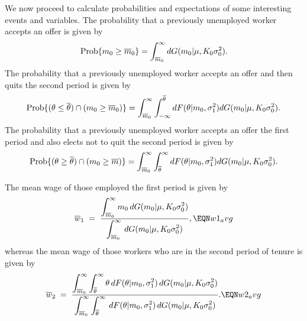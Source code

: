 We now proceed to calculate probabilities and expectations of some interesting
events and variables.  The probability that a previously unemployed worker
accepts an offer is given by
$${\rm Prob} \{m_0\ge\overline m_0\} = \int_{\overline m_0}^\infty dG (m_0|\mu,
K_0 \sigma^2_{0}).$$
The probability that a previously unemployed worker accepts an offer and then
quits the second period is given by
$$
{\rm Prob} \{({\theta}\le\overline{{\theta}})\cap (m_0\ge \overline m_0)\} =\int_{\overline m_0}^\infty
\int_{-\infty}^{\overline{{\theta}}} dF({\theta}|m_0, \sigma^2_{1})
dG (m_0|\mu, K_0 \sigma^2_{0}).$$
The probability that a previously unemployed worker accepts an offer the first
period and also elects not to quit the second period is given by
$${\rm Prob} \{({\theta}\ge\overline {{\theta}})\cap (m_0\ge\overline m)\} =\int_{\overline m_0}^\infty
\int_{\overline{{\theta}}}^\infty dF ({\theta}|m_0, \sigma^2_{1})
dG (m_0|\mu, K_0 \sigma^2_{0}).$$

The mean wage of those employed the first period is given by
$$
\overline w_1 \;=\; { \displaystyle \int_{\overline m_0}^\infty m_0
                                    \, dG(m_0 \vert \mu, K_0 \sigma^2_{0})
         \over \displaystyle \int_{\overline m_0}^\infty
                                    \, dG(m_0 \vert \mu, K_0 \sigma^2_{0}) },
\EQN w1_avg
$$
whereas the mean wage of those workers who are in the second period of tenure
is given by
$$
\overline w_2 \;=\; { \displaystyle \int_{\overline m_0}^\infty
                 \int_{\overline \theta}^\infty \theta
                             \, dF(\theta \vert m_0, \sigma_{1}^2)
                             \, dG(m_0 \vert \mu, K_0 \sigma^2_{0})
         \over \displaystyle \int_{\overline m_0}^\infty
                 \int_{\overline \theta}^\infty
                             \, dF(\theta \vert m_0, \sigma_{1}^2)
                             \, dG(m_0 \vert \mu, K_0 \sigma^2_{0})     }.
\EQN w2_avg
$$


